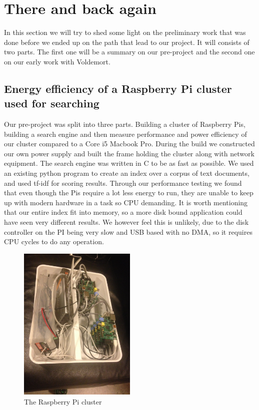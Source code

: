 \section{There and back again}
\label{sec:prequel}
In this section we will try to shed some light on the preliminary work that was done before we ended up on the path that lead to our project. It will consists of two parts. The first one will be a summary on our pre-project and the second one on our early work with Voldemort.

\subsection{Energy efficiency of a Raspberry Pi cluster used for searching}
Our pre-project was split into three parts. Building a cluster of Raspberry Pis, building a search engine and then measure performance and power efficiency of our cluster compared to a Core i5 Macbook Pro. During the build we constructed our own power supply and built the frame holding the cluster along with network equipment. The search engine was written in C to be as fast as possible. We used an existing python program to create an index over a corpus of text documents, and used tf-idf for scoring results. Through our performance testing we found that even though the Pis require a lot less energy to run, they are unable to keep up with modern hardware in a task so CPU demanding. It is worth mentioning that our entire index fit into memory, so a more disk bound application could have seen very different results. We however feel this is unlikely, due to the disk controller on the PI being very slow and USB based with no DMA, so it requires CPU cycles to do any operation.

\begin{figure}[h]
    \centering
    \includegraphics[width=0.5\textwidth]{thereandbackagain/cluster_beautiful.jpg}
    \caption{The Raspberry Pi cluster}
    \label{fig:cluster}
\end{figure}

